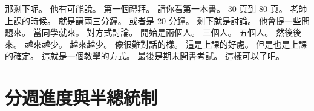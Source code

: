 \hypertarget{c01:cue:1098}{}那剩下呢。
\hypertarget{c01:cue:1099}{}他有可能說。
\hypertarget{c01:cue:1100}{}第一個禮拜。
\hypertarget{c01:cue:1101}{}請你看第一本書。
\hypertarget{c01:cue:1102}{}30 頁到 80 頁。
\hypertarget{c01:cue:1103}{}老師上課的時候。
\hypertarget{c01:cue:1104}{}就是講兩三分鐘。
\hypertarget{c01:cue:1105}{}或者是 20 分鐘。
\hypertarget{c01:cue:1106}{}剩下就是討論。
\hypertarget{c01:cue:1107}{}他會提一些問題來。
\hypertarget{c01:cue:1108}{}當同學就來。
\hypertarget{c01:cue:1109}{}對方式討論。
\hypertarget{c01:cue:1110}{}開始是兩個人。
\hypertarget{c01:cue:1111}{}三個人。
\hypertarget{c01:cue:1112}{}五個人。
\hypertarget{c01:cue:1113}{}然後後來。
\hypertarget{c01:cue:1114}{}越來越少。
\hypertarget{c01:cue:1115}{}越來越少。
\hypertarget{c01:cue:1116}{}像很難對話的樣。
\hypertarget{c01:cue:1117}{}這是上課的好處。
\hypertarget{c01:cue:1118}{}但是也是上課的確定。
\hypertarget{c01:cue:1119}{}這就是一個教學的方式。
\hypertarget{c01:cue:1120}{}最後是期末開書考試。
\hypertarget{c01:cue:1121}{}這樣可以了吧。

\section{分週進度與半總統制}

